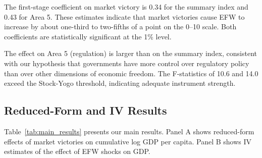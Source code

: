 \documentclass[12pt,a4paper]{article}
\begin{document}
The first-stage coefficient on market victory is 0.34 for the summary 
index and 0.43 for Area 5. These estimates indicate that market victories 
cause EFW to increase by about one-third to two-fifths of a point on 
the 0--10 scale. Both coefficients are statistically significant at the 
1\% level.

The effect on Area 5 (regulation) is larger than on the summary index, 
consistent with our hypothesis that governments have more control over 
regulatory policy than over other dimensions of economic freedom. The 
F-statistics of 10.6 and 14.0 exceed the Stock-Yogo threshold, indicating 
adequate instrument strength.

\subsection{Reduced-Form and IV Results}

Table~\ref{tab:main_results} presents our main results. Panel A shows 
reduced-form effects of market victories on cumulative log GDP per 
capita. Panel B shows IV estimates of the effect of EFW shocks on GDP.
\end{document}
